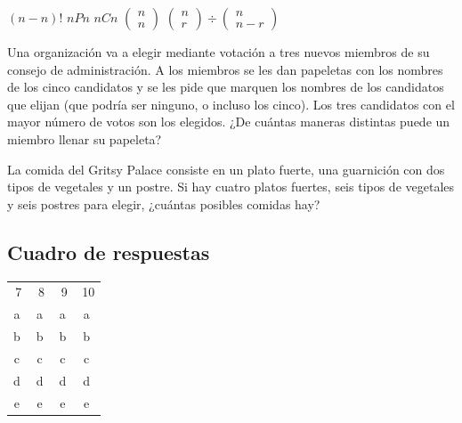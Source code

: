 \documentclass[10pt,addpoints]{exam}
\begin{document}
\begin{questions}
\begin{oneparchoices}
\choice $(n-n)!$
\CorrectChoice $nPn$
\choice $nCn$
\choice $\left(\begin{array}{c}
n\\
n
\end{array}
\right)$
\choice $\left(\begin{array}{c}
n\\
r
\end{array}\right)\div \left(\begin{array}{c}
n\\
n-r
\end{array}\right) $
\end{oneparchoices}
\question Una organización va a elegir mediante votación a tres nuevos miembros de su consejo de administración. A los miembros se les dan papeletas con los nombres de los cinco candidatos y se les pide que marquen los nombres de los candidatos que elijan (que podría ser ninguno, o incluso los cinco). Los tres candidatos con el mayor número de votos
son los elegidos. ¿De cuántas maneras distintas puede un miembro llenar su papeleta?

\begin{oneparchoices}
\end{oneparchoices}
\question La comida del Gritsy Palace consiste en un plato fuerte, una guarnición con dos tipos de vegetales y un postre. Si hay cuatro platos fuertes, seis tipos de vegetales y seis postres para elegir, ¿cuántas posibles comidas hay?

\begin{oneparchoices}
\end{oneparchoices}
\end{questions}
\begin{center}
\section*{Cuadro de respuestas}
\begin{tabular}{cccc}
7 & 8 & 9 & 10 \\ 
\textcircled{a} & \textcircled{a} & \textcircled{a} & \textcircled{a}\\ 
\textcircled{b} & \textcircled{b} & \textcircled{b} & \textcircled{b} \\ 
\textcircled{c} & \textcircled{c} & \textcircled{c} & \textcircled{c}\\ 
\textcircled{d} & \textcircled{d} & \textcircled{d} & \textcircled{d}\\ 
\textcircled{e} & \textcircled{e} & \textcircled{e} & \textcircled{e}\\
\end{tabular}
\end{center}
\end{document}

